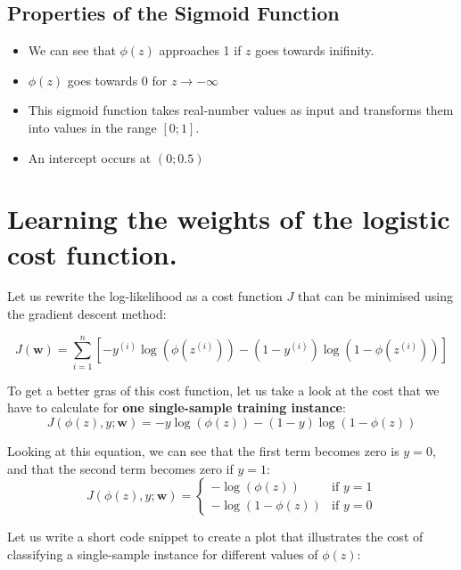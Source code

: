 \documentclass[11pt]{article}
\providecommand{\tightlist}{%
      \setlength{\itemsep}{0pt}\setlength{\parskip}{0pt}}
\begin{document}
    \subsection{Properties of the Sigmoid
Function}\label{properties-of-the-sigmoid-function}

\begin{itemize}
\tightlist
\item
  We can see that \(\phi(z)\) approaches 1 if \(z\) goes towards
  inifinity.
\item
  \(\phi(z)\) goes towards 0 for \(z \rightarrow -\infty\)
\item
  This sigmoid function takes real-number values as input and transforms
  them into values in the range \(\left[ 0; 1\right]\).
\item
  An intercept occurs at \(\left( 0; 0.5 \right)\)
\end{itemize}

    \section{Learning the weights of the logistic cost
function.}\label{learning-the-weights-of-the-logistic-cost-function.}

Let us rewrite the log-likelihood as a cost function \(J\) that can be
minimised using the gradient descent method:

\[
J\left( \mathbf{w} \right) = \sum\limits_{i = 1}^{n}\left[ -y^{(i)}\log\left( \phi\left( z^{(i)} \right) \right) - \left( 1 - y^{(i)} \right)\log\left( 1 - \phi\left( z^{(i)} \right) \right) \right]
\]

To get a better gras of this cost function, let us take a look at the
cost that we have to calculate for \textbf{one single-sample training
instance}: \[
J\left( \phi(z),y;\mathbf{w} \right) = -y\log\left( \phi(z) \right) - (1 - y)\log\left( 1 - \phi(z) \right)
\]

Looking at this equation, we can see that the first term becomes zero is
\(y = 0\), and that the second term becomes zero if \(y = 1\): \[
J\left( \phi(z),y;\mathbf{w} \right) = 
\left\{
    \begin{array}{ll}
        -\log\left( \phi(z) \right) & \mbox{if } y = 1 \\
        -\log\left( 1 - \phi(z) \right) & \mbox{if } y = 0
    \end{array}
\right.
\]

Let us write a short code snippet to create a plot that illustrates the
cost of classifying a single-sample instance for different values of
\(\phi(z)\):
\end{document}
